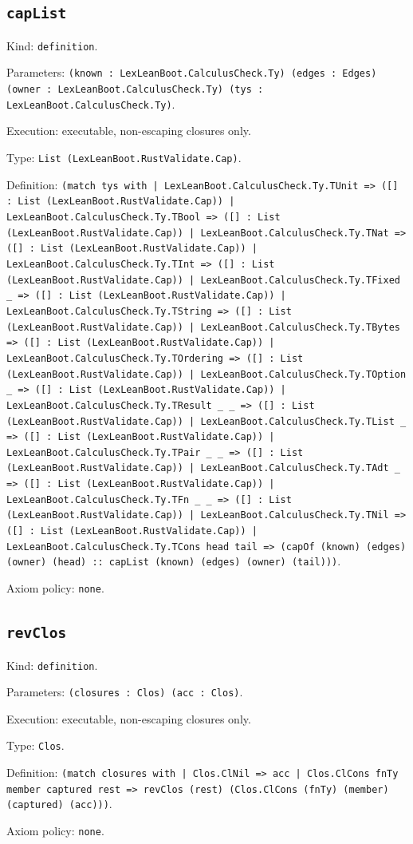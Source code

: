 \documentclass[11pt]{article}
\begin{document}
\subsection*{\texttt{capList}}
\noindent Kind: \texttt{definition}.\par
\noindent Parameters: \texttt{(known : LexLeanBoot.CalculusCheck.Ty) (edges : Edges) (owner : LexLeanBoot.CalculusCheck.Ty) (tys : LexLeanBoot.CalculusCheck.Ty)}.\par
\noindent Execution: executable, non-escaping closures only.\par
\noindent Type: \texttt{List (LexLeanBoot.RustValidate.Cap)}.\par
\noindent Definition: \texttt{(match tys with | LexLeanBoot.CalculusCheck.Ty.TUnit => ([] : List (LexLeanBoot.RustValidate.Cap)) | LexLeanBoot.CalculusCheck.Ty.TBool => ([] : List (LexLeanBoot.RustValidate.Cap)) | LexLeanBoot.CalculusCheck.Ty.TNat => ([] : List (LexLeanBoot.RustValidate.Cap)) | LexLeanBoot.CalculusCheck.Ty.TInt => ([] : List (LexLeanBoot.RustValidate.Cap)) | LexLeanBoot.CalculusCheck.Ty.TFixed \_ => ([] : List (LexLeanBoot.RustValidate.Cap)) | LexLeanBoot.CalculusCheck.Ty.TString => ([] : List (LexLeanBoot.RustValidate.Cap)) | LexLeanBoot.CalculusCheck.Ty.TBytes => ([] : List (LexLeanBoot.RustValidate.Cap)) | LexLeanBoot.CalculusCheck.Ty.TOrdering => ([] : List (LexLeanBoot.RustValidate.Cap)) | LexLeanBoot.CalculusCheck.Ty.TOption \_ => ([] : List (LexLeanBoot.RustValidate.Cap)) | LexLeanBoot.CalculusCheck.Ty.TResult \_ \_ => ([] : List (LexLeanBoot.RustValidate.Cap)) | LexLeanBoot.CalculusCheck.Ty.TList \_ => ([] : List (LexLeanBoot.RustValidate.Cap)) | LexLeanBoot.CalculusCheck.Ty.TPair \_ \_ => ([] : List (LexLeanBoot.RustValidate.Cap)) | LexLeanBoot.CalculusCheck.Ty.TAdt \_ => ([] : List (LexLeanBoot.RustValidate.Cap)) | LexLeanBoot.CalculusCheck.Ty.TFn \_ \_ => ([] : List (LexLeanBoot.RustValidate.Cap)) | LexLeanBoot.CalculusCheck.Ty.TNil => ([] : List (LexLeanBoot.RustValidate.Cap)) | LexLeanBoot.CalculusCheck.Ty.TCons head tail => (capOf (known) (edges) (owner) (head) :: capList (known) (edges) (owner) (tail)))}.\par
\noindent Axiom policy: \texttt{none}.\par
\subsection*{\texttt{revClos}}
\noindent Kind: \texttt{definition}.\par
\noindent Parameters: \texttt{(closures : Clos) (acc : Clos)}.\par
\noindent Execution: executable, non-escaping closures only.\par
\noindent Type: \texttt{Clos}.\par
\noindent Definition: \texttt{(match closures with | Clos.ClNil => acc | Clos.ClCons fnTy member captured rest => revClos (rest) (Clos.ClCons (fnTy) (member) (captured) (acc)))}.\par
\noindent Axiom policy: \texttt{none}.\par
\end{document}
